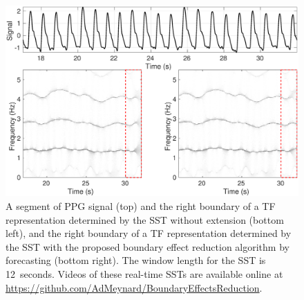 \documentclass[journal]{IEEEtran}
\begin{document}
\begin{figure}
\centering
\includegraphics[width=.48\textwidth]{PPGsig.eps}
\caption{A segment of PPG signal (top) and the right boundary of a TF representation determined by the SST without extension (bottom left), and the right boundary of a TF representation determined by the SST with the proposed boundary effect reduction algorithm by forecasting (bottom right). The window length for the SST is 12~seconds. Videos of these real-time SSTs are available online at \url{https://github.com/AdMeynard/BoundaryEffectsReduction}.}
\label{fig:ex.intro}
\end{figure}
\end{document}
